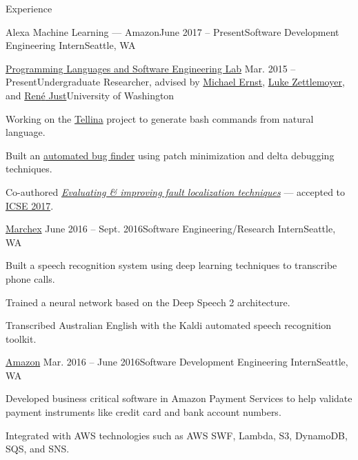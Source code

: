 \documentclass{resume} %
\begin{document}

\begin{rSection}{Experience}

  \begin{rSubheader}{Alexa Machine Learning --- Amazon}{June 2017 -- Present}{Software Development Engineering Intern}{Seattle, WA}
  \end{rSubheader}

  \begin{rSubsection}{\href{https://uwplse.org/}{Programming Languages and Software Engineering Lab}}
    {Mar. 2015 -- Present}{Undergraduate Researcher, advised by \href{https://homes.cs.washington.edu/~mernst/}{Michael Ernst}, \href{https://www.cs.washington.edu/people/faculty/lsz}{Luke Zettlemoyer}, and \href{https://people.cs.umass.edu/~rjust/}{Ren{\'e} Just}}{University of Washington}
  \item Working on the \href{https://github.com/TellinaTool}{Tellina} project to generate bash commands from natural language.
  \item Built an \href{https://github.com/dericp/patch-minimization}{automated bug finder} using patch minimization and delta debugging techniques.
  \item Co-authored \href{https://homes.cs.washington.edu/~dericp/resources/fault-localization-tr160803.pdf}{\emph{Evaluating \& improving fault localization techniques}} --- accepted to \href{http://icse2017.gatech.edu/}{ICSE 2017}.
  \end{rSubsection}
  
  \begin{rSubsection}{\href{http://www.marchex.com/}{Marchex}}
    {June 2016 -- Sept. 2016}{Software Engineering/Research Intern}{Seattle, WA}
  \item Built a speech recognition system using deep learning techniques to transcribe phone calls.
  \item Trained a neural network based on the Deep Speech 2 architecture.
  \item Transcribed Australian English with the Kaldi automated speech recognition toolkit.
  \end{rSubsection}

  \begin{rSubsection}{\href{https://www.amazon.com/}{Amazon}}
    {Mar. 2016 -- June 2016}{Software Development Engineering Intern}{Seattle, WA}
  \item Developed business critical software in Amazon Payment Services to help validate payment instruments like credit card and bank account numbers.
  \item Integrated with AWS technologies such as AWS SWF, Lambda, S3, DynamoDB, SQS, and SNS.
  \end{rSubsection}
  

\end{rSection}
\end{document}
